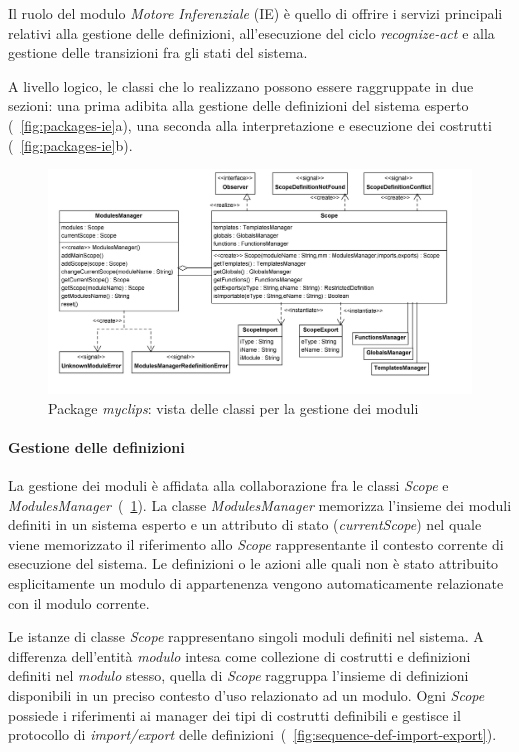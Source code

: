 Il ruolo del modulo \emph{Motore Inferenziale} (IE) è quello di offrire i servizi principali relativi alla gestione delle definizioni, all'esecuzione del ciclo \emph{recognize-act} e alla gestione delle transizioni fra gli stati del sistema.

A livello logico, le classi che lo realizzano possono essere raggruppate in due sezioni: una prima adibita alla gestione delle definizioni del sistema esperto (\figurename~\ref{fig:packages-ie}a), una seconda alla interpretazione e esecuzione dei costrutti (\figurename~\ref{fig:packages-ie}b).

\begin{figure}[h]
\centering
\includegraphics[width=1\textwidth]{Immagini/Capitolo3/Classi/myclips_Scope-ModulesManager.png}
\caption{Package \emph{myclips}: vista delle classi per la gestione dei moduli}\label{fig:class-myclips-scope-mm}
\end{figure}


\paragraph{Gestione delle definizioni}

La gestione dei moduli è affidata alla collaborazione fra le classi \emph{Scope} e \emph{ModulesManager}~(\figurename~\ref{fig:class-myclips-scope-mm}).
La classe \emph{ModulesManager} memorizza l'insieme dei moduli definiti in un sistema esperto e un attributo di stato (\emph{currentScope}) nel quale viene memorizzato il riferimento allo \emph{Scope} rappresentante il contesto corrente di esecuzione del sistema. Le definizioni o le azioni alle quali non è stato attribuito esplicitamente un modulo di appartenenza vengono automaticamente relazionate con il modulo corrente.

Le istanze di classe \emph{Scope} rappresentano singoli moduli definiti nel sistema. A differenza dell'entità \emph{modulo} intesa come collezione di costrutti e definizioni definiti nel \emph{modulo} stesso, quella di \emph{Scope} raggruppa l'insieme di definizioni disponibili in un preciso contesto d'uso relazionato ad un modulo. Ogni \emph{Scope} possiede i riferimenti ai manager dei tipi di costrutti definibili e gestisce il protocollo di \emph{import/export} delle definizioni~(\figurename~\ref{fig:sequence-def-import-export}).

